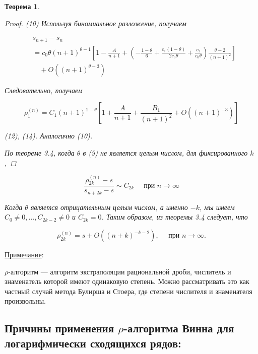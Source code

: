\documentclass[14pt, a4paper]{extarticle}
\newtheorem{theorem}{Теорема}[section] %
\theoremstyle{definition}
\theoremstyle{remark}
\begin{document}
\begin{theorem}
\begin{proof}
    
(10) Используя биномиальное разложение, получаем

\begin{subequations}
\begin{align}
& s_{n+1}-s_{n} \\
& =c_{0} \theta(n+1)^{\theta-1}\left[1-\frac{A}{n+1}+\left(-\frac{1-\theta}{6}+\frac{c_{1}(1-\theta)}{2 c_{0} \theta} +\frac{c_{2}}{c_{0} \theta}\right) \frac{\theta-2}{(n+1)^{2}}\right] \\
& \quad+O\left((n+1)^{\theta-3}\right)
\end{align}
    
\end{subequations}


Следовательно, получаем


\begin{equation}
\rho_{1}^{(n)}=C_{1}(n+1)^{1-\theta}\left[1+\frac{A}{n+1}+\frac{B_{1}}{(n+1)^{2}}+O\left((n+1)^{-3}\right)\right]
\end{equation}


(12), (14). Аналогично (10).

По теореме 3.4, когда $\theta$ в (9) не является целым числом, для фиксированного $k$,
\end{proof}

\begin{equation}
\frac{\rho_{2 k}^{(n)}-s}{s_{n+2 k}-s} \sim C_{2 k} \quad \text { при } n \rightarrow \infty 
\end{equation}


Когда $\theta$ является отрицательным целым числом, а именно $-k$, мы имеем $C_{0} \neq 0, \ldots, C_{2 k-2} \neq 0$ и $C_{2 k}=0$. Таким образом, из теоремы 3.4 следует, что


\begin{equation}
\rho_{2 k}^{(n)}=s+O\left((n+k)^{-k-2}\right), \quad \text { при } n \rightarrow \infty . 
\end{equation}

\end{theorem}
\uline{Примечание}:

\emph{$\rho$}-алгоритм --- алгоритм экстраполяции рациональной дроби,
числитель и знаменатель которой имеют одинаковую степень. Можно
рассматривать это как частный случай метода Булирша и Стоера, где
степени числителя и знаменателя произвольны.

\subsection{Причины применения $\rho$-алгоритма Винна для логарифмически
сходящихся рядов:}
\end{document}
